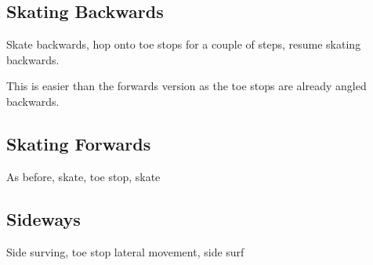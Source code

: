 \subsection{Skating Backwards}
Skate backwards, hop onto toe stops for a couple of steps, resume skating backwards.


This is easier than the forwards version as the toe stops are already angled backwards. 


\subsection{Skating Forwards}
As before, skate, toe stop, skate


\subsection{Sideways}

Side surving, toe stop lateral movement, side surf


